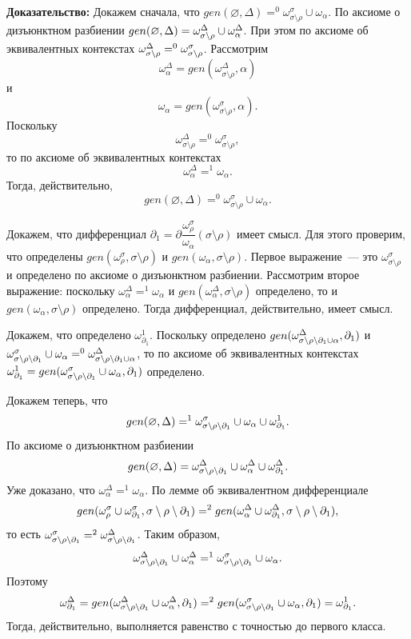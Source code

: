 \textbf{Доказательство:}
Докажем сначала, что $gen(\varnothing, \Delta) =^0 \omega^\sigma_{\sigma\setminus\rho} \cup \omega_\alpha$. По аксиоме о дизъюнктном разбиении $gen(\varnothing, \Delta) = \omega^\Delta_{\sigma\setminus\rho} \cup \omega^\Delta_\alpha$. При этом по аксиоме об эквивалентных контекстах $\omega^\Delta_{\sigma\setminus\rho} =^0 \omega^\sigma_{\sigma\setminus\rho}$. Рассмотрим $$\omega^\Delta_\alpha = gen(\omega^\Delta_{\sigma\setminus\rho}, \alpha)$$ 
и $$\omega_\alpha = gen(\omega^\sigma_{\sigma\setminus\rho}, \alpha).$$ 
Поскольку $$\omega^\Delta_{\sigma\setminus\rho} =^0 \omega^\sigma_{\sigma\setminus\rho},$$ 
то по аксиоме об эквивалентных контекстах $$\omega^\Delta_\alpha =^1 \omega_\alpha.$$ Тогда, действительно, $$gen(\varnothing, \Delta) =^0 \omega^\sigma_{\sigma\setminus\rho} \cup \omega_\alpha.$$ 

Докажем, что дифференциал $\partial_1 = \partial\dfrac{\omega^\sigma_\rho}{\omega_\alpha}(\sigma\setminus\rho)$ имеет смысл. Для этого проверим, что определены $gen(\omega^\sigma_\rho, \sigma\setminus\rho)$ и $gen(\omega_\alpha, \sigma\setminus\rho)$. Первое выражение~--- это $\omega^\sigma_{\sigma\setminus\rho}$ и определено по аксиоме о дизъюнктном разбиении. Рассмотрим второе выражение: поскольку $\omega^\Delta_\alpha =^1 \omega_\alpha$ и $gen(\omega^\Delta_\alpha, \sigma\setminus\rho)$ определено, то и $gen(\omega_\alpha, \sigma\setminus\rho)$ определено. Тогда дифференциал, действительно, имеет смысл.

Докажем, что определено $\omega^1_{\partial_1}$. Поскольку определено $gen(\omega^\Delta_{{\sigma\setminus\rho\setminus\partial_1} \cup \alpha}, \partial_1)$ и $\omega^\sigma_{{\sigma\setminus\rho\setminus\partial_1}} \cup \omega_\alpha =^0 \omega^\Delta_{{\sigma\setminus\rho\setminus\partial_1} \cup \alpha}$, то по аксиоме об эквивалентных контекстах $\omega^1_{\partial_1} = gen(\omega^\sigma_{{\sigma\setminus\rho\setminus\partial_1}} \cup \omega_\alpha, \partial_1)$ определено.

Докажем теперь, что $$gen(\varnothing, \Delta) =^1 \omega^\sigma_{{\sigma\setminus\rho\setminus\partial_1}} \cup \omega_\alpha \cup \omega^1_{\partial_1}.$$ 
По аксиоме о дизъюнктном разбиении $$gen(\varnothing, \Delta) = \omega^\Delta_{\sigma\setminus\rho\setminus\partial_1} \cup \omega^\Delta_\alpha \cup \omega^\Delta_{\partial_1}.$$ 
Уже доказано, что $\omega^\Delta_\alpha =^1 \omega_\alpha$. По лемме об эквивалентном дифференциале $$gen(\omega^\sigma_\rho \cup \omega^\sigma_{\partial_1}, {\sigma\setminus\rho\setminus\partial_1}) =^2 gen(\omega^\Delta_\alpha \cup \omega^\Delta_{\partial_1}, {\sigma\setminus\rho\setminus\partial_1}),$$ 
то есть $\omega^\sigma_{{\sigma\setminus\rho\setminus\partial_1}} =^2 \omega^\Delta_{{\sigma\setminus\rho\setminus\partial_1}}$. Таким образом, $$\omega^\Delta_{\sigma\setminus\rho\setminus\partial_1} \cup \omega^\Delta_\alpha =^1 \omega^\sigma_{{\sigma\setminus\rho\setminus\partial_1}} \cup \omega_\alpha.$$ 
Поэтому $$\omega^\Delta_{\partial_1} = gen(\omega^\Delta_{\sigma\setminus\rho\setminus\partial_1} \cup \omega^\Delta_\alpha, \partial_1) =^2 gen(\omega^\sigma_{{\sigma\setminus\rho\setminus\partial_1}} \cup \omega_\alpha, \partial_1) = \omega^1_{\partial_1}.$$ Тогда, действительно, выполняется равенство с точностью до первого класса.

